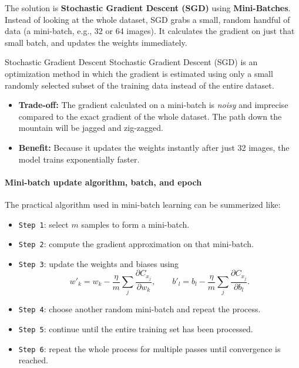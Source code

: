 \documentclass[11pt]{article}
\theoremstyle{smallexample}
\begin{document}
The solution is \textbf{Stochastic Gradient Descent (SGD)} using \textbf{Mini-Batches}.
Instead of looking at the whole dataset, SGD grabs a small, random handful of data (a mini-batch, e.g., 32 or 64 images). It calculates the gradient on just that small batch, and updates the weights immediately.

 \begin{defbox}{Stochastic Gradient Descent}
 Stochastic Gradient Descent (SGD) is an optimization method in which the gradient is estimated using only a small randomly selected subset of the training data instead of the entire dataset.
 \end{defbox}







\begin{itemize}
    \item \textbf{Trade-off:} The gradient calculated on a mini-batch is \textit{noisy} and imprecise compared to the exact gradient of the whole dataset. The path down the mountain will be jagged and zig-zagged.
    \item \textbf{Benefit:} Because it updates the weights instantly after just 32 images, the model trains exponentially faster.
\end{itemize}

\paragraph*{ Mini-batch update algorithm, batch, and epoch}

The practical algorithm used in mini-batch learning can be summerized like:



 \begin{itemize}
  \item \texttt{Step 1}: select \(m\) samples to form a mini-batch.

  \item \texttt{Step 2}: compute the gradient approximation on that mini-batch.
 
  \item \texttt{Step 3}: update the weights and biases using
  \[
  w'_k = w_k - \frac{\eta}{m}\sum_j \frac{\partial C_{x_j}}{\partial w_k},
  \qquad
  b'_l = b_l - \frac{\eta}{m}\sum_j \frac{\partial C_{x_j}}{\partial b_l}.
  \]
  \item \texttt{Step 4}: choose another random mini-batch and repeat the process.
  \item \texttt{Step 5}: continue until the entire training set has been processed.

  \item \texttt{Step 6}: repeat the whole process for multiple passes until convergence is reached.
 \end{itemize}
\end{document}
